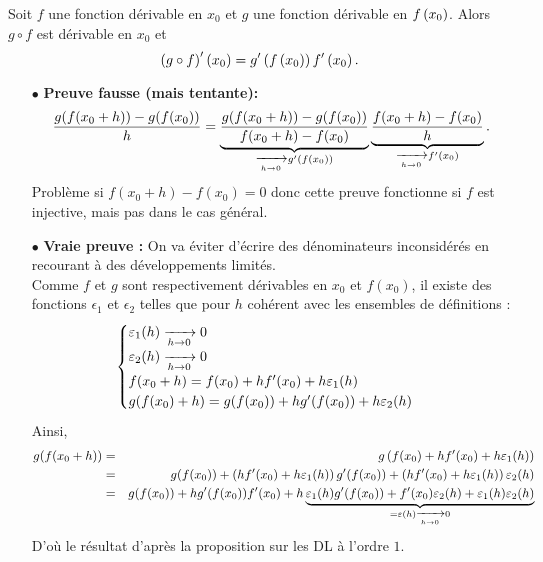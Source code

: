 \documentclass{magnolia}
\begin{document}
\begin{proposition}[utile=-3]
Soit $f$ une fonction dérivable en $x_0$ et $g$ une fonction dérivable en
$f\left(x_0\right)$. Alors $g\circ f$ est dérivable en $x_0$ et
\[\left(g\circ f\right)'\left(x_0\right)=g'\left(f\left(x_0\right)\right)f'\left(x_0\right).\]
\end{proposition}

\begin{preuve}
\begin{itemize}
\item[$\bullet$] \textbf{Preuve fausse (mais tentante):}
$$\frac{g(f(x_0+h))-g(f(x_0))}{h}=\underbrace{\frac{g(f(x_0+h))-g(f(x_0))}{f(x_0+h)-f(x_0)}}_{\xrightarrow[h\rightarrow 0]{}g'(f(x_0))}\underbrace{\frac{f(x_0+h)-f(x_0)}{h}}_{\xrightarrow[h\rightarrow 0]{}f'(x_0)}.$$
Problème si $f(x_0+h)-f(x_0)=0$ donc cette preuve fonctionne si $f$ est injective, mais pas dans le cas général.
\item[$\bullet$] \textbf{Vraie preuve :} On va éviter d'écrire des dénominateurs inconsidérés en recourant à des développements limités. \\
Comme $f$ et $g$ sont respectivement dérivables en $x_0$ et $f(x_0)$, il existe des fonctions $\epsilon_1$ et $\epsilon_2$ telles que pour $h$ cohérent avec les ensembles de définitions :
$$\begin{cases}
\varepsilon_1(h)\xrightarrow[h\rightarrow 0]{}0\\
\varepsilon_2(h)\xrightarrow[h\rightarrow 0]{}0\\
f(x_0+h)=f(x_0)+hf'(x_0)+h\varepsilon_1(h)\\
g(f(x_0)+h)=g(f(x_0))+hg'(f(x_0))+h\varepsilon_2(h)
\end{cases}$$
Ainsi, 
\begin{eqnarray*}
g(f(x_0+h))&=&g\left(f(x_0)+hf'(x_0)+h\varepsilon_1(h)\right)\\
&=&g(f(x_0))+\left(hf'(x_0)+h\varepsilon_1(h)\right)g'(f(x_0))+\left(hf'(x_0)+h\varepsilon_1(h)\right)\varepsilon_2(h)\\
&=&g(f(x_0))+hg'(f(x_0))f'(x_0)+h\underbrace{\varepsilon_1(h)g'(f(x_0))+f'(x_0)\varepsilon_2(h)+\varepsilon_1(h)\varepsilon_2(h)}_{=\varepsilon(h)\xrightarrow[h\rightarrow 0]{}0}
\end{eqnarray*}
D'où le résultat d'après la proposition sur les DL à l'ordre $1$.

\end{itemize}

\end{preuve}

\end{document}
